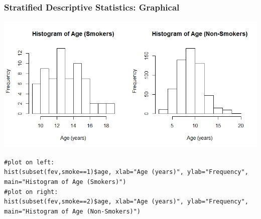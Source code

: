 \documentclass[12pt, 
hyperref={colorlinks=true, linkcolor=blue, urlcolor=cyan}]{beamer}
\begin{document}
\begin{frame}
\frametitle{Stratified Descriptive Statistics: Graphical}

\vspace{-0.5cm}
\begin{center} \includegraphics[width=\textwidth]{./histogram-age-stratified} \end{center}

\vspace{-0.75cm} \begin{scriptsize} \texttt{\#plot on left: \\ hist(subset(fev,smoke==1)\$age, xlab="Age (years)", ylab="Frequency", main="Histogram of Age (Smokers)")} \\
\texttt{\#plot on right: \\ hist(subset(fev,smoke==2)\$age, xlab="Age (years)", ylab="Frequency", main="Histogram of Age (Non-Smokers)")\\} \end{scriptsize}
\end{frame}
\end{document}
